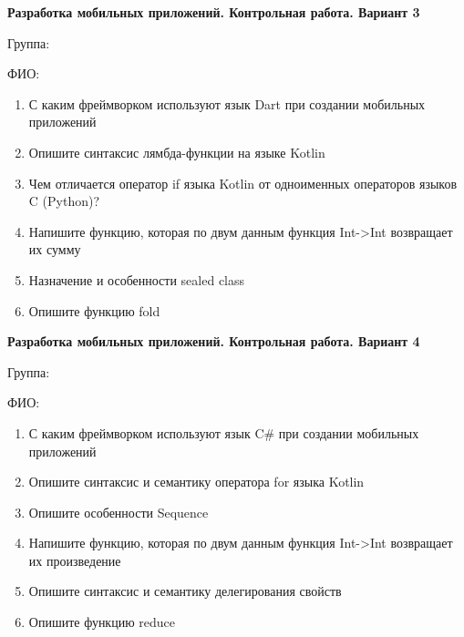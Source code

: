 \documentclass[12pt]{article}
\begin{document}
\newpage\begin{minipage}{\textwidth}
\textbf{Разработка мобильных приложений. Контрольная работа. Вариант 3}

Группа: \underline{\hspace{3cm}}

ФИО: \underline{\hspace{10cm}}

\begin{enumerate}
\item С каким фреймворком используют язык Dart при создании мобильных приложений
\item Опишите синтаксис лямбда-функции на языке Kotlin
\item Чем отличается оператор if языка Kotlin от одноименных операторов языков C (Python)?
\item Напишите функцию, которая по двум данным функция Int->Int возвращает их сумму
\item Назначение и особенности sealed class
\item Опишите функцию fold

\end{enumerate}
\end{minipage}

\newpage\begin{minipage}{\textwidth}
\textbf{Разработка мобильных приложений. Контрольная работа. Вариант 4}

Группа: \underline{\hspace{3cm}}

ФИО: \underline{\hspace{10cm}}

\begin{enumerate}
\item С каким фреймворком используют язык C\# при создании мобильных приложений
\item Опишите синтаксис и семантику оператора for языка Kotlin
\item Опишите особенности Sequence
\item Напишите функцию, которая по двум данным функция Int->Int возвращает их произведение
\item Опишите синтаксис и семантику делегирования свойств
\item Опишите функцию reduce

\end{enumerate}
\end{minipage}
\end{document}

